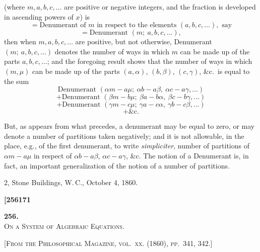 \documentclass[11pt]{article}
\begin{document}
\noindent (where $m, a, b, c, \ldots$ are positive or negative integers, and the fraction is developed in ascending powers of $x$) is
\[
= \text{Denumerant of } m \text{ in respect to the elements } (a, b, c, \ldots),\text{ say}
\]
\[
= \text{Denumerant } (m;\ a, b, c, \ldots),
\]
then when $m, a, b, c, \ldots$ are positive, but not otherwise, Denumerant $(m;\ a, b, c, \ldots)$ denotes the number of ways in which $m$ can be made up of the parts $a, b, c, \ldots$; and the foregoing result shows that the number of ways in which $(m, \mu)$ can be made up of the parts $(a, \alpha)$, $(b, \beta)$, $(c, \gamma)$, \&c.\ is equal to the sum
\[
\text{Denumerant } (\alpha m - a\mu;\ \alpha b - a\beta,\ \alpha c - a\gamma, \ldots)
\]
\[
+ \text{Denumerant } (\beta m - b\mu;\ \beta a - b\alpha,\ \beta c - b\gamma, \ldots)
\]
\[
+ \text{Denumerant } (\gamma m - c\mu;\ \gamma a - c\alpha,\ \gamma b - c\beta, \ldots)
\]
\[
+ \text{\&c.}
\]

But, as appears from what precedes, a denumerant may be equal to zero, or may denote a number of partitions taken negatively; and it is not allowable, in the place, e.g., of the first denumerant, to write \textit{simpliciter}, number of partitions of $\alpha m - a\mu$ in respect of $\alpha b - a\beta$, $\alpha c - a\gamma$, \&c. The notion of a Denumerant is, in fact, an important generalization of the notion of a number of partitions.

\medskip

\hfill 2, Stone Buildings, W.\,C., October 4, 1860.

\newpage


\noindent\textbf{[256}\hfill\hfill\textbf{171}

\medskip

\begin{center}
\textbf{256.}\\[0.6em]
{\Large\textsc{On a System of Algebraic Equations.}}
\end{center}

\medskip

\textsc{[From the Philosophical Magazine, vol.~xx. (1860), pp.~341, 342.]}

\medskip
\end{document}
